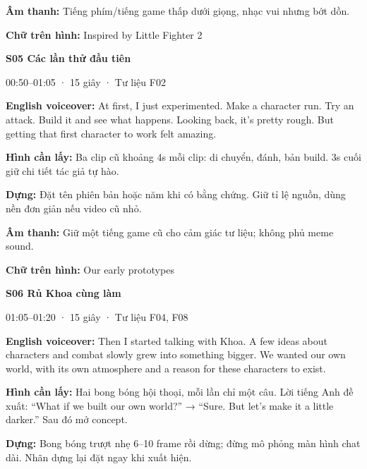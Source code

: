 \documentclass[10pt,a4paper]{article}
\begin{document}
\textbf{Âm thanh:}  Tiếng phím/tiếng game thấp dưới giọng, nhạc vui nhưng bớt dồn.\par

\textbf{Chữ trên hình:}  Inspired by Little Fighter 2\par

\textbf{S05 Các lần thử đầu tiên}\par

00:50–01:05 · 15 giây · Tư liệu F02\par

\textbf{English voiceover:}  At first, I just experimented. Make a character run. Try an attack. Build it and see what happens. Looking back, it’s pretty rough. But getting that first character to work felt amazing.\par

\textbf{Hình cần lấy:}  Ba clip cũ khoảng 4s mỗi clip: di chuyển, đánh, bản build. 3s cuối giữ chi tiết tác giả tự hào.\par

\textbf{Dựng:}  Đặt tên phiên bản hoặc năm khi có bằng chứng. Giữ tỉ lệ nguồn, dùng nền đơn giản nếu video cũ nhỏ.\par

\textbf{Âm thanh:}  Giữ một tiếng game cũ cho cảm giác tư liệu; không phủ meme sound.\par

\textbf{Chữ trên hình:}  Our early prototypes\par

\textbf{S06 Rủ Khoa cùng làm}\par

01:05–01:20 · 15 giây · Tư liệu F04, F08\par

\textbf{English voiceover:}  Then I started talking with Khoa. A few ideas about characters and combat slowly grew into something bigger. We wanted our own world, with its own atmosphere and a reason for these characters to exist.\par

\textbf{Hình cần lấy:}  Hai bong bóng hội thoại, mỗi lần chỉ một câu. Lời tiếng Anh đề xuất: “What if we built our own world?” → “Sure. But let’s make it a little darker.” Sau đó mở concept.\par

\textbf{Dựng:}  Bong bóng trượt nhẹ 6–10 frame rồi dừng; đừng mô phỏng màn hình chat dài. Nhãn dựng lại đặt ngay khi xuất hiện.\par
\end{document}
